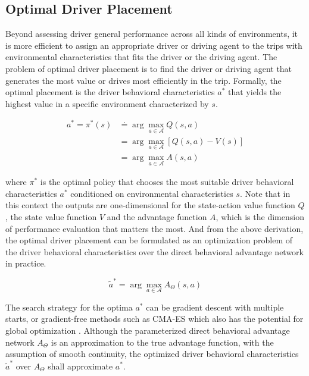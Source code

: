 \documentclass{article}
\begin{document}
\subsection{Optimal Driver Placement}\label{sec:optimal_driver_placement}

Beyond assessing driver general performance across all kinds of environments, it is more efficient to assign an appropriate driver or driving agent to the trips with environmental characteristics that fits the driver or the driving agent. The problem of optimal driver placement is to find the driver or driving agent that generates the most value or drives most efficiently in the trip. Formally, the optimal placement is the driver behavioral characteristics $ a^{*} $ that yields the highest value in a specific environment characterized by $ s $.

\[
\begin{split}
    a^{*} = \pi^{*}(s) 
    &\doteq \arg\max_{a \in \mathcal{A}} Q(s, a) \\
    &= \arg\max_{a \in \mathcal{A}} \left[ Q(s, a) - V(s) \right] \\
    &= \arg\max_{a \in \mathcal{A}} A(s, a)
\end{split}
\]

where $ \pi^{*} $ is the optimal policy that chooses the most suitable driver behavioral characteristics $ a^{*} $ conditioned on environmental characteristics $ s $. Note that in this context the outputs are one-dimensional for the state-action value function $ Q $, the state value function $ V $ and the advantage function $ A $, which is the dimension of performance evaluation that matters the most. And from the above derivation, the optimal driver placement can be formulated as an optimization problem of the driver behavioral characteristics over the direct behavioral advantage network in practice.

\[
\tilde{a}^{*} = \arg\max_{a \in \mathcal{A}} A_{\Theta}(s, a)
\]

The search strategy for the optima $ a^{*} $ can be gradient descent with multiple starts, or gradient-free methods such as CMA-ES \cite{hansen2001completely} which also has the potential for global optimization \cite{hansen2004evaluating, auger2005restart, auger2005performance, hansen2009benchmarking}. Although the parameterized direct behavioral advantage network $ A_{\Theta} $ is an approximation to the true advantage function, with the assumption of smooth continuity, the optimized driver behavioral characteristics $ \tilde{a}^{*} $ over $ A_{\Theta} $ shall approximate $ a^{*} $.
\end{document}
